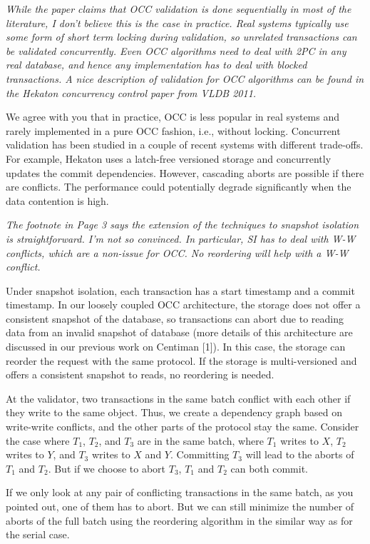 \documentclass{article}
\begin{document}
\emph{While the paper claims that OCC validation is done sequentially in most of the literature, I don't believe this is the case in practice. Real systems typically use some form of short term locking during validation, so unrelated transactions can be validated concurrently. Even OCC algorithms need to deal with 2PC in any real database, and hence any implementation has to deal with blocked transactions. A nice description of validation for OCC algorithms can be found in the Hekaton concurrency control paper from VLDB 2011. }

We agree with you that in practice, OCC is less popular in real systems and rarely implemented in a pure OCC fashion, i.e., without locking. Concurrent validation has been studied in a couple of recent systems with different trade-offs. For example, Hekaton uses a latch-free versioned storage and concurrently updates the commit dependencies. However, cascading aborts are possible if there are conflicts. The performance could potentially degrade significantly when the data contention is high.

\emph{The footnote in Page 3 says the extension of the techniques to snapshot isolation is straightforward. I'm not so convinced. In particular, SI has to deal with W-W conflicts, which are a non-issue for OCC. No reordering will help with a W-W conflict.
}

Under snapshot isolation, each transaction has a start timestamp and a commit timestamp. In our loosely coupled OCC architecture, the storage does not offer a consistent snapshot of the database, so transactions can abort due to reading data from an invalid snapshot of database (more details of this architecture are discussed in our previous work on Centiman [1]). In this case, the storage can reorder the request with the same protocol. If the storage is multi-versioned and offers a consistent snapshot to reads, no reordering is needed.

At the validator, two transactions in the same batch conflict with each other if they write to the same object. Thus, we create a dependency graph based on write-write conflicts, and the other parts of the protocol stay the same. Consider the case where $T_1$, $T_2$, and $T_3$ are in the same batch, where $T_1$ writes to $X$, $T_2$ writes to $Y$, and $T_3$ writes to $X$ and $Y$. Committing $T_3$ will lead to the aborts of $T_1$ and $T_2$. But if we choose to abort $T_3$, $T_1$ and $T_2$ can both commit.

If we only look at any pair of conflicting transactions in the same batch, as you pointed out, one of them has to abort. But we can still minimize the number of aborts of the full batch using the reordering algorithm in the similar way as for the serial case.
\end{document}
